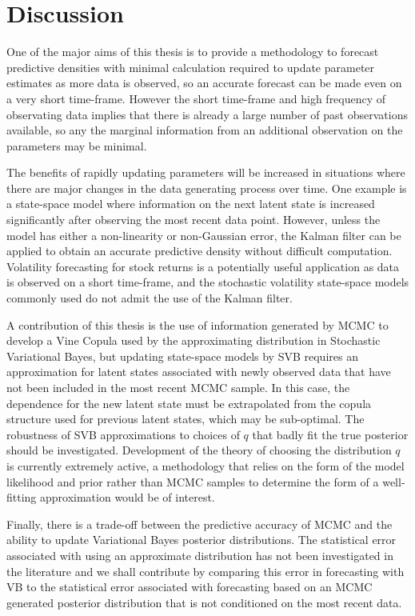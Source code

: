 \documentclass[12pt,a4paper]{article}%
\numberwithin{equation}{section}
\begin{document}
\section{Discussion} \label{sec:Discussion}

One of the major aims of this thesis is to provide a methodology to forecast predictive densities with minimal calculation required to update parameter estimates as more data is observed, so an accurate forecast can be made even on a very short time-frame. However the short time-frame and high frequency of observating data implies that there is already a large number of past observations available, so any the marginal information from an additional observation on the parameters may be minimal. 

The benefits of rapidly updating parameters will be increased in situations where there are major changes in the data generating process over time. One example is a state-space model where information on the next latent state is increased significantly after observing the most recent data point. However, unless the model has either a non-linearity or non-Gaussian error, the Kalman filter can be applied to obtain an accurate predictive density without difficult computation. Volatility forecasting for stock returns is a potentially useful application as data is observed on a short time-frame, and the stochastic volatility state-space models commonly used do not admit the use of the Kalman filter. 

A contribution of this thesis is the use of information generated by MCMC to develop a Vine Copula used by the approximating distribution in Stochastic Variational Bayes, but updating state-space models by SVB requires an approximation for latent states associated with newly observed data that have not been included in the most recent MCMC sample. In this case, the dependence for the new latent state must be extrapolated from the copula structure used for previous latent states, which may be sub-optimal. The robustness of SVB approximations to choices of $q$ that badly fit the true posterior should be investigated. Development of the theory of choosing the distribution $q$ is currently extremely active, a methodology that relies on the form of the model likelihood and prior rather than MCMC samples to determine the form of a well-fitting approximation would be of interest. 

Finally, there is a trade-off between the predictive accuracy of MCMC and the ability to update Variational Bayes posterior distributions. The statistical error associated with using an approximate distribution has not been investigated in the literature and we shall contribute by comparing this error in forecasting with VB to the statistical error associated with forecasting based on an MCMC generated posterior distribution that is not conditioned on the most recent data.
\end{document}
